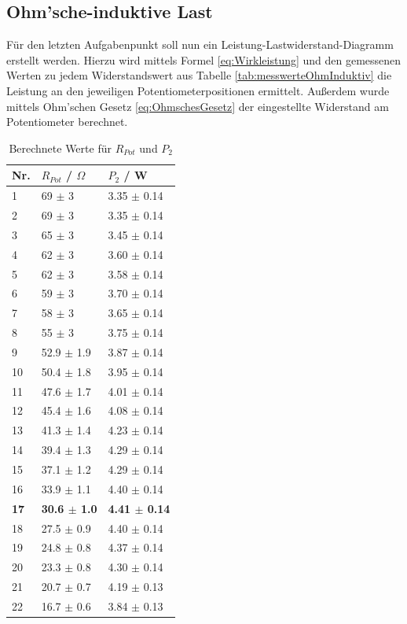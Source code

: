 \documentclass[12pt,a4paper,twoside]{article}
\begin{document}
\subsection{Ohm'sche-induktive Last}

Für den letzten Aufgabenpunkt soll nun ein Leistung-Lastwiderstand-Diagramm erstellt werden. Hierzu wird mittels Formel \ref{eq:Wirkleistung} und den gemessenen Werten zu jedem Widerstandswert aus Tabelle \ref{tab:messwerteOhmInduktiv} die Leistung an den jeweiligen Potentiometerpositionen ermittelt.
Außerdem wurde mittels Ohm'schen Gesetz \ref{eq:OhmschesGesetz} der eingestellte Widerstand am Potentiometer berechnet.

\begin{table}[H]
    \centering
    \caption{Berechnete Werte für $R_{Pot}$ und $P_{2}$}
    \label{tab:berechnungenRPotP2}
    \begin{tabular}{| l | l | l |}
        \hline
        Nr.  & $R_{Pot}$ / $\Omega$ & $P_{2}$ / W \\
        \hline
        1  & 69 $\pm$ 3 & 3.35 $\pm$ 0.14 \\
        2  & 69 $\pm$ 3 & 3.35 $\pm$ 0.14 \\
        3  & 65 $\pm$ 3 & 3.45 $\pm$ 0.14 \\
        4  & 62 $\pm$ 3 & 3.60 $\pm$ 0.14 \\
        5  & 62 $\pm$ 3 & 3.58 $\pm$ 0.14 \\
        6  & 59 $\pm$ 3 & 3.70 $\pm$ 0.14 \\
        7  & 58 $\pm$ 3 & 3.65 $\pm$ 0.14 \\
        8  & 55 $\pm$ 3 & 3.75 $\pm$ 0.14 \\
        9  & 52.9 $\pm$ 1.9 & 3.87 $\pm$ 0.14 \\
        10 & 50.4 $\pm$ 1.8 & 3.95 $\pm$ 0.14 \\
        11 & 47.6 $\pm$ 1.7 & 4.01 $\pm$ 0.14 \\
        12 & 45.4 $\pm$ 1.6 & 4.08 $\pm$ 0.14 \\
        13 & 41.3 $\pm$ 1.4 & 4.23 $\pm$ 0.14 \\
        14 & 39.4 $\pm$ 1.3 & 4.29 $\pm$ 0.14 \\
        15 & 37.1 $\pm$ 1.2 & 4.29 $\pm$ 0.14 \\
        16 & 33.9 $\pm$ 1.1 & 4.40 $\pm$ 0.14 \\
        \textbf{17} & \textbf{30.6 $\pm$ 1.0} & \textbf{4.41 $\pm$ 0.14} \\
        18 & 27.5 $\pm$ 0.9 & 4.40 $\pm$ 0.14 \\
        19 & 24.8 $\pm$ 0.8 & 4.37 $\pm$ 0.14 \\
        20 & 23.3 $\pm$ 0.8 & 4.30 $\pm$ 0.14 \\
        21 & 20.7 $\pm$ 0.7 & 4.19 $\pm$ 0.13 \\
        22 & 16.7 $\pm$ 0.6 & 3.84 $\pm$ 0.13 \\
        \hline
    \end{tabular}
\end{table}
\end{document}
